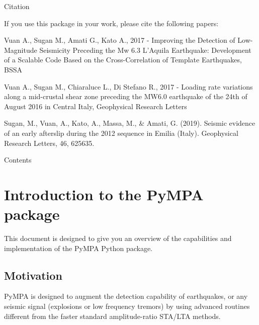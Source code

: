 \documentclass[a4paper,12pt,english]{sphinxmanual}
\begin{document}
Citation

If you use this package in your work, please cite the following papers:

Vuan A., Sugan M., Amati G., Kato A., 2017 - Improving the Detection of Low-Magnitude Seismicity Preceding the Mw 6.3 L’Aquila Earthquake: Development of a Scalable Code Based on the Cross-Correlation of Template Earthquakes, BSSA 

Vuan A., Sugan M., Chiaraluce L., Di Stefano R., 2017 - Loading rate variations along a mid-crustal shear zone preceding the MW6.0 earthquake of the 24th of August 2016 in Central Italy, Geophysical Research Letters 

Sugan, M., Vuan, A., Kato, A., Massa, M., \& Amati, G. (2019). Seismic evidence of an early afterslip during the 2012 sequence in Emilia (Italy). Geophysical Research Letters, 46, 625\textendash{}635. 

Contents


\chapter{Introduction to the PyMPA package}
\label{\detokenize{intro:introduction-to-the-pympa-package}}\label{\detokenize{intro::doc}}
This document is designed to give you an overview of the capabilities and
implementation of the PyMPA Python package.


\section{Motivation}
\label{\detokenize{intro:motivation}}
PyMPA is designed to augment the detection capability of earthquakes, or any seismic signal
(explosions or low frequency tremors) by using advanced routines different from the faster standard
amplitude-ratio STA/LTA methods.
\end{document}
